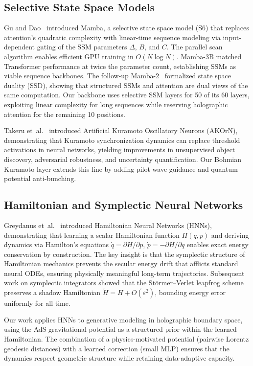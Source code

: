 \documentclass[11pt,a4paper,twocolumn]{article}
\begin{document}
\subsection{Selective State Space Models}

Gu and Dao~\cite{gu2023mamba} introduced Mamba, a selective state space model (S6) that replaces attention's quadratic complexity with linear-time sequence modeling via input-dependent gating of the SSM parameters $\Delta$, $B$, and $C$.
The parallel scan algorithm enables efficient GPU training in $O(N \log N)$.
Mamba-3B matched Transformer performance at twice the parameter count, establishing SSMs as viable sequence backbones.
The follow-up Mamba-2~\cite{mamba2_2024} formalized state space duality (SSD), showing that structured SSMs and attention are dual views of the same computation.
Our backbone uses selective SSM layers for 50 of its 60 layers, exploiting linear complexity for long sequences while reserving holographic attention for the remaining 10 positions.

Takeru et~al.~\cite{akorn2025} introduced Artificial Kuramoto Oscillatory Neurons (AKOrN), demonstrating that Kuramoto synchronization dynamics can replace threshold activations in neural networks, yielding improvements in unsupervised object discovery, adversarial robustness, and uncertainty quantification.
Our Bohmian Kuramoto layer extends this line by adding pilot wave guidance and quantum potential anti-bunching.

\subsection{Hamiltonian and Symplectic Neural Networks}

Greydanus et~al.~\cite{greydanus2019} introduced Hamiltonian Neural Networks (HNNs), demonstrating that learning a scalar Hamiltonian function $H(q,p)$ and deriving dynamics via Hamilton's equations $\dot{q}=\partial H/\partial p$, $\dot{p}=-\partial H/\partial q$ enables exact energy conservation by construction.
The key insight is that the symplectic structure of Hamiltonian mechanics prevents the secular energy drift that afflicts standard neural ODEs, ensuring physically meaningful long-term trajectories.
Subsequent work on symplectic integrators showed that the St\"ormer--Verlet leapfrog scheme preserves a shadow Hamiltonian $\tilde{H} = H + O(\varepsilon^2)$, bounding energy error uniformly for all time.

Our work applies HNNs to generative modeling in holographic boundary space, using the AdS gravitational potential as a structured prior within the learned Hamiltonian.
The combination of a physics-motivated potential (pairwise Lorentz geodesic distances) with a learned correction (small MLP) ensures that the dynamics respect geometric structure while retaining data-adaptive capacity.
\end{document}
